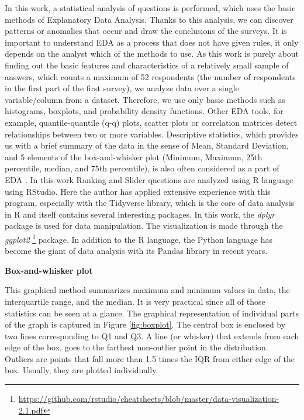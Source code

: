 \documentclass[a4paper,10pt,twoside]{article}
\begin{document}
\noindent In this work, a statistical analysis of questions is
performed, which uses the basic methods of Explanatory Data
Analysis. Thanks to this analysis, we can discover patterns or
anomalies that occur and draw the conclusions of the surveys. It is
important to understand EDA as a process that does not have given
rules, it only depends on the analyst which of the methods to use. As
this work is purely about finding out the basic features and
characteristics of a relatively small sample of answers, which counts
a maximum of 52 respondents (the number of respondents in the first
part of the first survey), we analyze data over a single
variable/column from a dataset. Therefore, we use only basic methods
such as histograms, boxplots, and probability density functions. Other
EDA tools, for example, quantile-quantile (q-q) plots, scatter plots
or correlation matrices detect relationships between two or more
variables. Descriptive statistics, which provides us with a brief
summary of the data in the sense of Mean, Standard Deviation, and 5
elements of the box-and-whisker plot (Minimum, Maximum, 25th
percentile, median, and 75th percentile), is also often considered as
a part of EDA \cite{heroku} \cite{luminousmen}. In this work Ranking
and Slider questions are analyzed using R language using RStudio. Here
the author has applied extensive experience with this program,
especially with the Tidyverse library, which is the core of data
analysis in R and itself contains several interesting packages. In
this work, the \textit{dplyr} package is used for data
manipulation. The visualization is made through the \textit{ggplot2}
\footnote{\url{https://github.com/rstudio/cheatsheets/blob/master/data-visualization-2.1.pdf}}
package. In addition to the R language, the Python language has become
the giant of data analysis with its Pandas library in recent years.

\bigskip
\noindent \textbf{Box-and-whisker plot}

\noindent This graphical method summarizes maximum and minimum values
in data, the interquartile range, and the median. It is very practical
since all of those statistics can be seen at a glance. The graphical
representation of individual parts of the graph is captured in Figure
\ref{fig:boxplot}. The central box is enclosed by two lines
corresponding to Q1 and Q3. A line (or whisker) that extends from each
edge of the box, goes to the farthest non-outlier point in the
distribution. Outliers are points that fall more than 1.5 times the
IQR from either edge of the box. Usually, they are plotted
individually.
\end{document}
